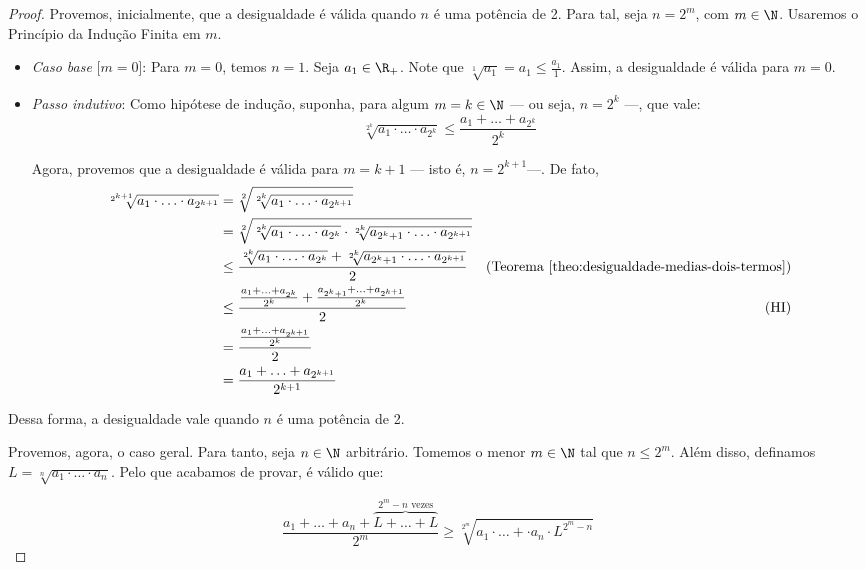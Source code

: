 \begin{proof}
	Provemos, inicialmente, que a desigualdade é válida quando $n$ é uma potência de 2.
	Para tal, seja $n = 2^m$, com $m \in \N$.
	Usaremos o Princípio da Indução Finita em $m$.

	\begin{itemize}
		\item \emph{Caso base} [$m=0$]: Para $m=0$, temos $n=1$. 
		Seja $a_1 \in \R_+$. 
		Note que $\sqrt[1]{a_1}=a_1\le \frac{a_1}{1}$.
		Assim, a desigualdade é válida para $m=0$.

		\item \emph{Passo indutivo}: Como hipótese de indução, suponha, para algum $m=k\in \N$ --- ou seja, $n=2^k$ ---, que vale:
		$$
		\sqrt[2^k]{a_1 \cdot \dots \cdot a_{2^k}}\le \frac{a_1 + \dots + a_{2^k}}{2^k}
		$$

		Agora, provemos que a desigualdade é válida para $m=k+1$ --- isto é, $n = 2^{k+1}$---. De fato,
		\begin{align*}
		\sqrt[2^{k+1}]{a_1 \cdot \ldots \cdot a_{2^{k+1}}} &= \sqrt[2]{\sqrt[2^k]{a_1 \cdot \ldots \cdot a_{2^{k+1}}}}&  \\
		& = \sqrt[2]{ \sqrt[2^k]{a_1 \cdot \ldots \cdot a_{2^k}} \cdot \sqrt[2^k]{a_{2^k+1} \cdot \ldots \cdot a_{2^{k+1}}}}& \\
		& \le \frac{\sqrt[2^k]{a_1 \cdot \ldots \cdot a_{2^k}} + \sqrt[2^k]{a_{2^k+1} \cdot \ldots \cdot a_{2^{k+1}}}  }{2} & \text{(Teorema \ref{theo:desigualdade-medias-dois-termos})}\\
		& \le \frac{ \frac{a_1 + \ldots + a_{2^k}}{2^k} + \frac{a_{2^k+1}+\ldots+a_{2^{k+1}}}{2^k}    }{2} & \text{(HI)}\\
		& = \frac{\frac{a_1 + \ldots + a_{2^{k+1}}}{2^k}}{2} & \\
		& = \frac{a_1 + \ldots + a_{2^{k+1}}}{2^{k+1}}  &
		\end{align*}
		
	\end{itemize}

	Dessa forma, a desigualdade vale quando $n$ é uma potência de 2.

	Provemos, agora, o caso geral.
	Para tanto, seja $n \in \N$ arbitrário.
	Tomemos o menor $m \in \N$ tal que $n \le 2^m$.
	Além disso, definamos $L = \sqrt[n]{a_1 \cdot \ldots \cdot a_n}$.
	Pelo que acabamos de provar, é válido que:

	$$
	\frac{a_1 + \ldots + a_n + \overbrace{L+\ldots + L}^{2^m - n \text{ vezes}}}{2^m} \ge \sqrt[2^m]{a_1 \cdot \ldots +\cdot a_n \cdot L^{2^m-n}}
	$$


\end{proof}
